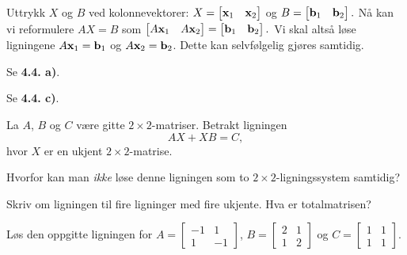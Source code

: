 \begin{losning}
\begin{punkt}
Uttrykk $X$ og $B$ ved kolonnevektorer: $X=\begin{bmatrix}
\mathbf{x}_1 & \mathbf{x}_2
\end{bmatrix}$ og $B=\begin{bmatrix}
\mathbf{b}_1 & \mathbf{b}_2
\end{bmatrix}.$ Nå kan vi reformulere $AX=B$ som $\begin{bmatrix}
A\mathbf{x}_1 & A\mathbf{x}_2
\end{bmatrix}=\begin{bmatrix}
\mathbf{b}_1 & \mathbf{b}_2
\end{bmatrix}.$ Vi skal altså løse ligningene $A\mathbf{x}_1=\mathbf{b}_1$ og $A\mathbf{x}_2=\mathbf{b}_2$. Dette kan selvfølgelig gjøres samtidig.
\end{punkt}

\begin{punkt}
Se \textbf{4.4. a)}.
\end{punkt}


\begin{punkt}
Se \textbf{4.4. c)}.
\end{punkt}

\end{losning}

\begin{oppgave}
La $A$, $B$ og $C$ være gitte $2\times 2$-matriser. Betrakt ligningen $$AX+XB=C,$$ hvor $X$ er en ukjent $2\times 2$-matrise.

\begin{punkt}
Hvorfor kan man \emph{ikke} løse denne ligningen som to $2\times 2$-ligningssystem samtidig?
\end{punkt}

\begin{punkt}
Skriv om ligningen til fire ligninger med fire ukjente. Hva er totalmatrisen? 
\end{punkt}


\begin{punkt}
Løs den oppgitte ligningen for 
$A=\begin{bmatrix}
-1 & 1\\
1 & -1
\end{bmatrix}$, $B=\begin{bmatrix}
2 & 1\\
1 & 2
\end{bmatrix}$ og $C=\begin{bmatrix}
1 & 1\\
1 & 1
\end{bmatrix}.$
\end{punkt}

\end{oppgave}


